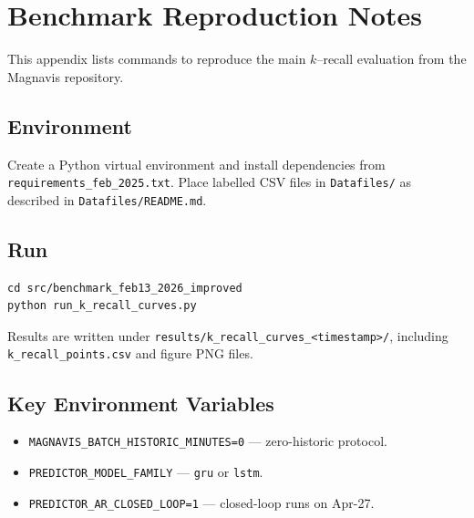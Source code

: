 \chapter{Benchmark Reproduction Notes}\doublespacing
\label{AppendixA}

This appendix lists commands to reproduce the main $k$--recall evaluation from the Magnavis repository.

\section{Environment}
Create a Python virtual environment and install dependencies from \texttt{requirements\_feb\_2025.txt}. Place labelled CSV files in \texttt{Datafiles/} as described in \texttt{Datafiles/README.md}.

\section{Run}
\begin{verbatim}
cd src/benchmark_feb13_2026_improved
python run_k_recall_curves.py
\end{verbatim}

Results are written under \texttt{results/k\_recall\_curves\_<timestamp>/}, including \texttt{k\_recall\_points.csv} and figure PNG files.

\section{Key Environment Variables}
\begin{itemize}
    \item \texttt{MAGNAVIS\_BATCH\_HISTORIC\_MINUTES=0} --- zero-historic protocol.
    \item \texttt{PREDICTOR\_MODEL\_FAMILY} --- \texttt{gru} or \texttt{lstm}.
    \item \texttt{PREDICTOR\_AR\_CLOSED\_LOOP=1} --- closed-loop runs on Apr-27.
\end{itemize}
